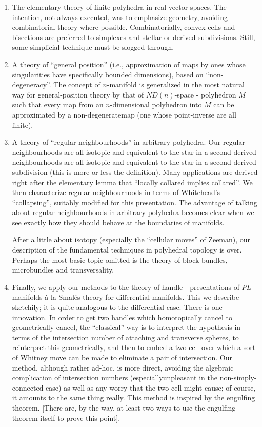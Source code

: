 \begin{enumerate}
\renewcommand{\labelenumi}{(\theenumi)}
\item The elementary theory of finite polyhedra in real vector spaces. The intention, not always executed, was to emphasize geometry, avoiding combinatorial theory where possible. Combinatorially, convex cells and bisections are preferred to simplexes and stellar or derived subdivisions. Still, some simplicial technique must be slogged through.

\item A theory of ``general position''  (i.e., approximation of maps by ones whose singularities have specifically bounded dimensions), based on ``non-degeneracy''. The concept of $n$-manifold is generalized in the most natural way for general-position theory by that of $ND(n)$-space - polyhedron $M$ such that every map from an $n$-dimensional polyhedron into $M$ can be approximated by a non-degenerate\pageoriginale map (one whose point-inverse are all finite). 

\item A theory of ``regular neighbourhoods'' in arbitrary polyhedra. Our regular neighbourhoods are all isotopic and equivalent to the star in a second-derived neighbourhoods are all isotopic and equivalent to the star in a second-derived subdivision (this is more or less the definition). Many applications are derived right after the elementary lemma that ``locally collared implies collared''. We then characterize regular neighbourhoods in terms of Whitehead's ``collapsing'', suitably modified for this presentation. The advantage of talking about regular neighbourhoods in arbitrary polyhedra becomes clear when we see exactly how they should behave at the boundaries of manifolds.

After a little about isotopy (especially the ``cellular moves'' of Zeeman), our description of the fundamental techniques in polyhedral topology is over. Perhaps the most basic topic omitted is the theory of block-bundles, microbundles and transversality.

\item Finally, we apply our methods to the theory of handle - presentations of $PL$-manifolds \`a la Smal\'es theory for differential manifolds. This we describe sketchily; it is quite analogous to the differential case. There is one innovation. In order to get two handles which homotopically cancel to geometrically cancel, the ``classical'' way is to interpret the hypothesis in terms of the intersection number of attaching and transverse spheres, to reinterpret this geometrically, and then to embed a two-cell over which a sort of Whitney move can be made to eliminate a pair of intersection. Our method, although rather ad-hoc, is more direct, avoiding the algebraic complication of intersection numbers (especially\pageoriginale unpleasant in the non-simply-connected case) as well as any worry that the two-cell might cause; of course, it amounts to the same thing really. This method is inspired by the engulfing theorem. [There are, by the way, at least two ways to use the engulfing theorem itself to prove this point].
\end{enumerate}

